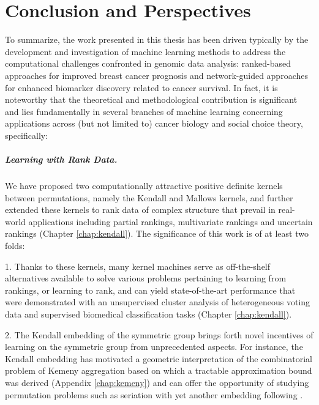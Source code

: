 \chapter{Conclusion and Perspectives}
\label{chap:conclusion}

To summarize, the work presented in this thesis has been driven typically by the development and investigation of machine learning methods to address the computational challenges confronted in genomic data analysis: ranked-based approaches for improved breast cancer prognosis and network-guided approaches for enhanced biomarker discovery related to cancer survival. In fact, it is noteworthy that the theoretical and methodological contribution is significant and lies fundamentally in several branches of machine learning concerning applications across (but not limited to) cancer biology and social choice theory, specifically:


\paragraph{Learning with Rank Data.}

We have proposed two computationally attractive positive definite kernels between permutations, namely the Kendall and Mallows kernels, and further extended these kernels to rank data of complex structure that prevail in real-world applications including partial rankings, multivariate rankings and uncertain rankings (Chapter \ref{chap:kendall}). The significance of this work is of at least two folds: 
\begin{bulletList}
\item[1.] Thanks to these kernels, many kernel machines serve as off-the-shelf alternatives available to solve various problems pertaining to learning from rankings, or learning to rank, and can yield state-of-the-art performance that were demonstrated with an unsupervised cluster analysis of heterogeneous voting data and supervised biomedical classification tasks (Chapter \ref{chap:kendall}).
\item[2.] The Kendall embedding of the symmetric group brings forth novel incentives of learning on the symmetric group from unprecedented aspects. For instance, the Kendall embedding has motivated a geometric interpretation of the combinatorial problem of Kemeny aggregation based on which a tractable approximation bound was derived (Appendix \ref{chap:kemeny}) and can offer the opportunity of studying permutation problems such as seriation with yet another embedding following \cite{Fogel2013Convex, Lim2014Beyond}.
\end{bulletList}


